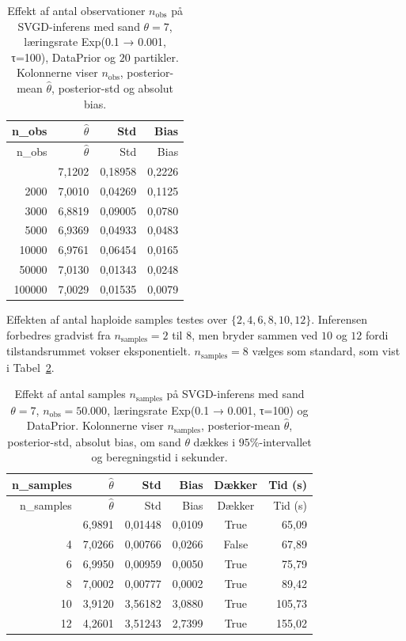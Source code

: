 \documentclass[
  10pt,
  a4paper,
]{scrbook}
\begin{document}
\begin{longtable}[]{@{}rrrr@{}}
\caption{Effekt af antal observationer \(n_{\text{obs}}\) på
SVGD-inferens med sand \(\theta = 7\), læringsrate Exp(0.1 → 0.001,
τ=100), DataPrior og \(20\) partikler. Kolonnerne viser
\(n_{\text{obs}}\), posterior-mean \(\hat\theta\), posterior-std og
absolut bias.}\label{tbl-nobs-niter}\tabularnewline
\toprule\noalign{}
n\_obs & \(\hat\theta\) & Std & Bias \\
\midrule\noalign{}
\endfirsthead
\toprule\noalign{}
n\_obs & \(\hat\theta\) & Std & Bias \\
\midrule\noalign{}
\endhead
\bottomrule\noalign{}
\endlastfoot
1000 & 7,1202 & 0,18958 & 0,2226 \\
2000 & 7,0010 & 0,04269 & 0,1125 \\
3000 & 6,8819 & 0,09005 & 0,0780 \\
5000 & 6,9369 & 0,04933 & 0,0483 \\
10000 & 6,9761 & 0,06454 & 0,0165 \\
50000 & 7,0130 & 0,01343 & 0,0248 \\
100000 & 7,0029 & 0,01535 & 0,0079 \\
\end{longtable}

Effekten af antal haploide samples testes over
\(\{2, 4, 6, 8, 10, 12\}\). Inferensen forbedres gradvist fra
\(n_{\text{samples}} = 2\) til \(8\), men bryder sammen ved \(10\) og
\(12\) fordi tilstandsrummet vokser eksponentielt.
\(n_{\text{samples}} = 8\) vælges som standard, som vist i
Tabel~\ref{tbl-nsamples}.

\begin{longtable}[]{@{}rrrrcr@{}}
\caption{Effekt af antal samples \(n_{\text{samples}}\) på SVGD-inferens
med sand \(\theta = 7\), \(n_{\text{obs}} = 50.000\), læringsrate
Exp(0.1 → 0.001, τ=100) og DataPrior. Kolonnerne viser
\(n_{\text{samples}}\), posterior-mean \(\hat\theta\), posterior-std,
absolut bias, om sand \(\theta\) dækkes i \(95\%\)-intervallet og
beregningstid i sekunder.}\label{tbl-nsamples}\tabularnewline
\toprule\noalign{}
n\_samples & \(\hat\theta\) & Std & Bias & Dækker & Tid (s) \\
\midrule\noalign{}
\endfirsthead
\toprule\noalign{}
n\_samples & \(\hat\theta\) & Std & Bias & Dækker & Tid (s) \\
\midrule\noalign{}
\endhead
\bottomrule\noalign{}
\endlastfoot
2 & 6,9891 & 0,01448 & 0,0109 & True & 65,09 \\
4 & 7,0266 & 0,00766 & 0,0266 & False & 67,89 \\
6 & 6,9950 & 0,00959 & 0,0050 & True & 75,79 \\
8 & 7,0002 & 0,00777 & 0,0002 & True & 89,42 \\
10 & 3,9120 & 3,56182 & 3,0880 & True & 105,73 \\
12 & 4,2601 & 3,51243 & 2,7399 & True & 155,02 \\
\end{longtable}
\end{document}

